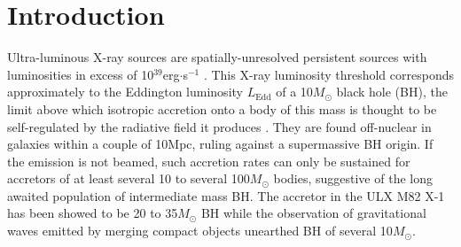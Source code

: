 \documentclass[letter]{aa}
\makeatletter
\newcommand*{\bh}{BH\@\xspace}
\newcommand*{\msun}{$M_{\odot}$\@\xspace}
\newcommand*{\ledd}{$L_{\text{Edd}}$\@\xspace}
\makeatother
\begin{document}

   \maketitle
%

\section{Introduction}

Ultra-luminous X-ray sources are spatially-unresolved persistent sources with luminosities in excess of 10$^{39}$erg$\cdot$s$^{-1}$ \citep[see][for a recent review]{Kaaret2017}. This X-ray luminosity threshold corresponds approximately to the Eddington luminosity \ledd of a 10\msun black hole (\bh), the limit above which isotropic accretion onto a body of this mass is thought to be self-regulated by the radiative field it produces \citep{Rappaport2005}. They are found off-nuclear in galaxies within a couple of 10Mpc, ruling against a supermassive \bh origin. If the emission is not beamed, such accretion rates can only be sustained for accretors of at least several 10 to several 100\msun bodies, suggestive of the long awaited population of intermediate mass \bh \citep{Colbert1999}. The accretor in the ULX M82 X-1 \citep{Brightman2016} has been showed to be 20 to 35\msun \bh while the observation of gravitational waves emitted by merging compact objects unearthed \bh of several 10\msun \citep{Abbott2016}.
\end{document}

